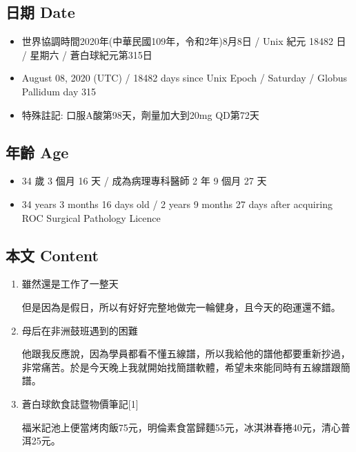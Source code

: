 \documentclass[a5paper, 11pt
]{book}
\providecommand{\tightlist}{%
  \setlength{\itemsep}{0pt}\setlength{\parskip}{0pt}}
\begin{document}
\hypertarget{ux65e5ux671f-date-68}{%
\subsection{日期 Date}\label{ux65e5ux671f-date-68}}

\begin{itemize}
\tightlist
\item
  世界協調時間2020年(中華民國109年，令和2年)8月8日 / Unix 紀元 18482 日
  / 星期六 / 蒼白球紀元第315日
\item
  August 08, 2020 (UTC) / 18482 days since Unix Epoch / Saturday /
  Globus Pallidum day 315
\item
  特殊註記: 口服A酸第98天，劑量加大到20mg QD第72天
\end{itemize}

\hypertarget{ux5e74ux9f61-age-68}{%
\subsection{年齡 Age}\label{ux5e74ux9f61-age-68}}

\begin{itemize}
\tightlist
\item
  34 歲 3 個月 16 天 / 成為病理專科醫師 2 年 9 個月 27 天
\item
  34 years 3 months 16 days old / 2 years 9 months 27 days after
  acquiring ROC Surgical Pathology Licence
\end{itemize}

\hypertarget{ux672cux6587-content-68}{%
\subsection{本文 Content}\label{ux672cux6587-content-68}}

\begin{enumerate}
\def\labelenumi{\arabic{enumi}.}
\item
  雖然還是工作了一整天

  但是因為是假日，所以有好好完整地做完一輪健身，且今天的砲運還不錯。
\item
  母后在非洲鼓班遇到的困難

  他跟我反應說，因為學員都看不懂五線譜，所以我給他的譜他都要重新抄過，非常痛苦。於是今天晚上我就開始找簡譜軟體，希望未來能同時有五線譜跟簡譜。
\item
  蒼白球飲食誌暨物價筆記{[}1{]}

  福米記池上便當烤肉飯75元，明倫素食當歸麵55元，冰淇淋春捲40元，清心普洱25元。
\end{enumerate}
\end{document}
